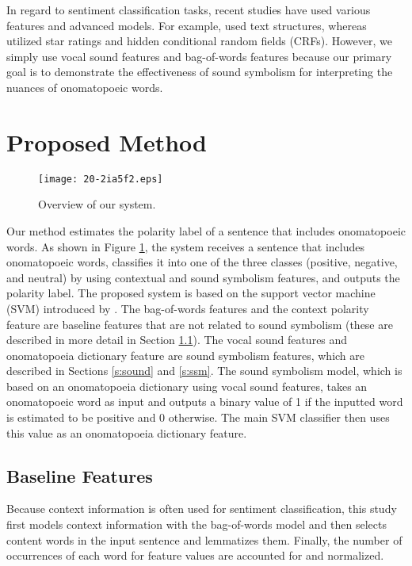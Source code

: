 \documentclass[english]{jnlp_1.4}
\begin{document}
In regard to sentiment classification tasks, recent studies have used various features and advanced models.
For example, \cite{Kudo2004} used text structures, whereas \cite{Tackstrom2011} utilized star ratings and hidden conditional random fields (CRFs).
However, we simply use vocal sound features and bag-of-words features because our primary goal is
to demonstrate the effectiveness of sound symbolism for interpreting the nuances of onomatopoeic words.


\section{Proposed Method}

\begin{figure}[b]
\begin{center}
\texttt{[image: 20-2ia5f2.eps]}
\end{center}
\caption{Overview of our system.}
\label{f:flow}
\end{figure}

Our method estimates the polarity label of a sentence that includes onomatopoeic words.
As shown in Figure \ref{f:flow}, the system receives a sentence that includes onomatopoeic words,
classifies it into one of the three classes (positive, negative, and neutral) by using contextual and sound symbolism features, and outputs the polarity label.
The proposed system is based on the support vector machine (SVM) introduced by \cite{svm}.
The bag-of-words features and the context polarity feature are baseline features that are not related to sound symbolism (these are described in more detail in Section \ref{s:context}).
The vocal sound features and onomatopoeia dictionary feature are sound symbolism features, which are described in Sections \ref{s:sound} and \ref{s:ssm}.
The sound symbolism model, which is based on an onomatopoeia dictionary using vocal sound features,
takes an onomatopoeic word as input and outputs a binary value of 1 if the inputted word is estimated to be positive and 0 otherwise.
The main SVM classifier then uses this value as an onomatopoeia dictionary feature.


\subsection{Baseline Features}
\label{s:context}

Because context information is often used for sentiment classification, this study first models context information with the bag-of-words model
and then selects content words in the input sentence and lemmatizes them.
Finally, the number of occurrences of each word for feature values are accounted for and normalized.
\end{document}
